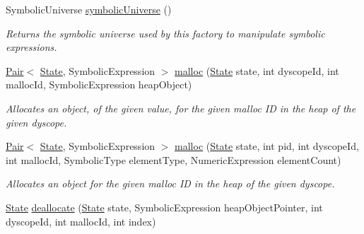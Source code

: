 \begin{DoxyCompactItemize}
Symbolic\+Universe \hyperlink{classedu_1_1udel_1_1cis_1_1vsl_1_1civl_1_1state_1_1common_1_1immutable_1_1ImmutableStateFactory_a545a89e6de9775ca52721c9c794da12b}{symbolic\+Universe} ()
\begin{DoxyCompactList}\small\item\em Returns the symbolic universe used by this factory to manipulate symbolic expressions. \end{DoxyCompactList}\item 
\hyperlink{classedu_1_1udel_1_1cis_1_1vsl_1_1civl_1_1util_1_1IF_1_1Pair}{Pair}$<$ \hyperlink{interfaceedu_1_1udel_1_1cis_1_1vsl_1_1civl_1_1state_1_1IF_1_1State}{State}, Symbolic\+Expression $>$ \hyperlink{classedu_1_1udel_1_1cis_1_1vsl_1_1civl_1_1state_1_1common_1_1immutable_1_1ImmutableStateFactory_a521481b4006af34010ce856f4f539a39}{malloc} (\hyperlink{interfaceedu_1_1udel_1_1cis_1_1vsl_1_1civl_1_1state_1_1IF_1_1State}{State} state, int dyscope\+Id, int malloc\+Id, Symbolic\+Expression heap\+Object)
\begin{DoxyCompactList}\small\item\em Allocates an object, of the given value, for the given malloc I\+D in the heap of the given dyscope. \end{DoxyCompactList}\item 
\hyperlink{classedu_1_1udel_1_1cis_1_1vsl_1_1civl_1_1util_1_1IF_1_1Pair}{Pair}$<$ \hyperlink{interfaceedu_1_1udel_1_1cis_1_1vsl_1_1civl_1_1state_1_1IF_1_1State}{State}, Symbolic\+Expression $>$ \hyperlink{classedu_1_1udel_1_1cis_1_1vsl_1_1civl_1_1state_1_1common_1_1immutable_1_1ImmutableStateFactory_a336133449bfe76264c72cc15bb3e0bc3}{malloc} (\hyperlink{interfaceedu_1_1udel_1_1cis_1_1vsl_1_1civl_1_1state_1_1IF_1_1State}{State} state, int pid, int dyscope\+Id, int malloc\+Id, Symbolic\+Type element\+Type, Numeric\+Expression element\+Count)
\begin{DoxyCompactList}\small\item\em Allocates an object for the given malloc I\+D in the heap of the given dyscope. \end{DoxyCompactList}\item 
\hyperlink{interfaceedu_1_1udel_1_1cis_1_1vsl_1_1civl_1_1state_1_1IF_1_1State}{State} \hyperlink{classedu_1_1udel_1_1cis_1_1vsl_1_1civl_1_1state_1_1common_1_1immutable_1_1ImmutableStateFactory_adbb5cfa400e857cedde973811105fed9}{deallocate} (\hyperlink{interfaceedu_1_1udel_1_1cis_1_1vsl_1_1civl_1_1state_1_1IF_1_1State}{State} state, Symbolic\+Expression heap\+Object\+Pointer, int dyscope\+Id, int malloc\+Id, int index)

\end{DoxyCompactItemize}
